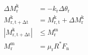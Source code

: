 \documentclass[12pt]{article}
\begin{document}
\begin{align}
 \Delta M_\mathrm{r}^\mathrm{k} & = -k_\mathrm{r} \Delta \theta_\mathrm{r} \\
 M_\mathrm{r,t+\Delta t}^\mathrm{k} & = M_\mathrm{r,t}^\mathrm{k} + \Delta M_\mathrm{r}^\mathrm{k} \\
 |M_\mathrm{r,t+\Delta t}^\mathrm{k}| & \leq M_\mathrm{r}^\mathrm{m} \\
 M_\mathrm{r}^\mathrm{m} & = \mu_\mathrm{r} R^* F_\mathrm{n}
\end{align}
\end{document}
